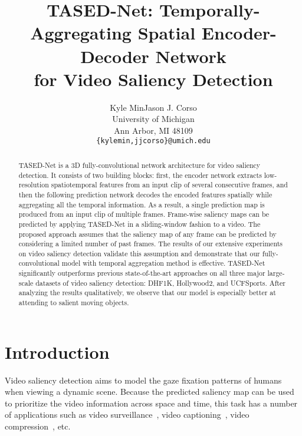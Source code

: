 \documentclass[10pt,twocolumn,letterpaper]{article}
\newcommand{\modelname}{TASED-Net}
\newcommand{\modelnamelong}{Temporally-Aggregating Spatial Encoder-Decoder}
\begin{document}
\title{\modelname{}: \modelnamelong{} Network \\for Video Saliency Detection}

\author{Kyle Min\quad Jason J. Corso\\
University of Michigan\\
Ann Arbor, MI 48109\\
{\tt\small \{kylemin,jjcorso\}@umich.edu}
}

\maketitle
\ificcvfinal\thispagestyle{empty}\fi


\begin{abstract}
   \modelname{} is a 3D fully-convolutional network architecture for video saliency detection. It consists of two building blocks: first, the encoder network extracts low-resolution spatiotemporal features from an input clip of several consecutive frames, and then the following prediction network decodes the encoded features spatially while aggregating all the temporal information. As a result, a single prediction map is produced from an input clip of multiple frames. Frame-wise saliency maps can be predicted by applying \modelname{} in a sliding-window fashion to a video. The proposed approach assumes that the saliency map of any frame can be predicted by considering a limited number of past frames. The results of our extensive experiments on video saliency detection validate this assumption and demonstrate that our fully-convolutional model with temporal aggregation method is effective. \modelname{} significantly outperforms previous state-of-the-art approaches on all three major large-scale datasets of video saliency detection: DHF1K, Hollywood2, and UCFSports. After analyzing the results qualitatively, we observe that our model is especially better at attending to salient moving objects.
\end{abstract} 
\section{Introduction} \label{sec:intro}
Video saliency detection aims to model the gaze fixation patterns of humans when viewing a dynamic scene. Because the predicted saliency map can be used to prioritize the video information across space and time, this task has a number of applications such as video surveillance~\cite{guraya2010predictive, yubing2011spatiotemporal}, video captioning~\cite{nguyen2013static}, video compression~\cite{guo2010novel, hadizadeh2014saliency}, etc.
\end{document}

